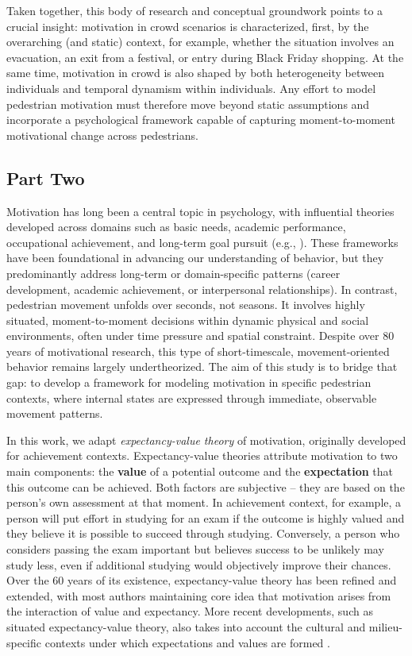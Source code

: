 \documentclass[pdflatex,sn-mathphys-num]{sn-jnl}%
\theoremstyle{thmstyleone}%
\theoremstyle{thmstyletwo}%
\theoremstyle{thmstylethree}%
\begin{document}
Taken together, this body of research and conceptual groundwork points to a crucial insight: motivation in crowd scenarios is characterized, first, by the overarching (and static) context, for example, whether the situation involves an evacuation, an exit from a festival, or entry during Black Friday shopping. At the same time, motivation in crowd is also shaped by both heterogeneity between individuals and temporal dynamism within individuals. Any effort to model pedestrian motivation must therefore move beyond static assumptions and incorporate a psychological framework capable of capturing moment-to-moment motivational change across pedestrians.


\subsection{Part Two} 
Motivation has long been a central topic in psychology, with influential theories developed across domains such as basic needs, academic performance, occupational achievement, and long-term goal pursuit (e.g., \cite{lewin_field_1942,atkinson_introduction_1964,vroom_work_1964}). These frameworks have been foundational in advancing our understanding of behavior, but they predominantly address long-term or domain-specific patterns (career development, academic achievement, or interpersonal relationships). In contrast, pedestrian movement unfolds over seconds, not seasons. It involves highly situated, moment-to-moment decisions within dynamic physical and social environments, often under time pressure and spatial constraint. Despite over 80 years of motivational research, this type of short-timescale, movement-oriented behavior remains largely undertheorized. The aim of this study is to bridge that gap: to develop a framework for modeling motivation in specific pedestrian contexts, where internal states are expressed through immediate, observable movement patterns.

In this work, we adapt \textit{expectancy-value theory} \cite{atkinson_introduction_1964, vroom_work_1964, wigfield_expectancy-value_2000, eccles_expectancy_2020} of motivation, originally developed for achievement contexts. Expectancy-value theories attribute motivation to two main components: the \textbf{value} of a potential outcome and the \textbf{expectation} that this outcome can be achieved. Both factors are subjective – they are based on the person's own assessment at that moment. In achievement context, for example, a person will put effort in studying for an exam if the outcome is highly valued and they believe it is possible to succeed through studying. Conversely, a person who considers passing the exam important but believes success to be unlikely may study less, even if additional studying would objectively improve their chances. Over the 60 years of its existence, expectancy-value theory has been refined and extended, with most authors maintaining core idea that motivation arises from the interaction of value and expectancy. More recent developments, such as situated expectancy-value theory, also takes into account the cultural and milieu-specific contexts under which expectations and values are formed \cite{eccles_motivational_2002}.
\end{document}
